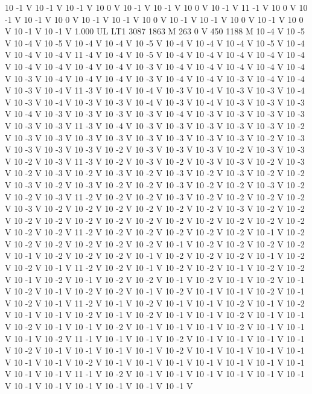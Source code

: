 {{10 -1 V
10 -1 V
10 -1 V
10 0 V
10 -1 V
10 -1 V
10 0 V
10 -1 V
11 -1 V
10 0 V
10 -1 V
10 -1 V
10 0 V
10 -1 V
10 -1 V
10 0 V
10 -1 V
10 -1 V
10 0 V
10 -1 V
10 0 V
10 -1 V
10 -1 V
1.000 UL
LT1
3087 1863 M
263 0 V
450 1188 M
10 -4 V
10 -5 V
10 -4 V
10 -5 V
10 -4 V
10 -4 V
10 -5 V
10 -4 V
10 -4 V
10 -4 V
10 -5 V
10 -4 V
10 -4 V
10 -4 V
11 -4 V
10 -4 V
10 -5 V
10 -4 V
10 -4 V
10 -4 V
10 -4 V
10 -4 V
10 -4 V
10 -4 V
10 -4 V
10 -4 V
10 -3 V
10 -4 V
10 -4 V
10 -4 V
10 -4 V
10 -4 V
10 -3 V
10 -4 V
10 -4 V
10 -4 V
10 -3 V
10 -4 V
10 -4 V
10 -3 V
10 -4 V
10 -4 V
10 -3 V
10 -4 V
11 -3 V
10 -4 V
10 -4 V
10 -3 V
10 -4 V
10 -3 V
10 -3 V
10 -4 V
10 -3 V
10 -4 V
10 -3 V
10 -3 V
10 -4 V
10 -3 V
10 -4 V
10 -3 V
10 -3 V
10 -3 V
10 -4 V
10 -3 V
10 -3 V
10 -3 V
10 -3 V
10 -4 V
10 -3 V
10 -3 V
10 -3 V
10 -3 V
10 -3 V
10 -3 V
11 -3 V
10 -4 V
10 -3 V
10 -3 V
10 -3 V
10 -3 V
10 -3 V
10 -2 V
10 -3 V
10 -3 V
10 -3 V
10 -3 V
10 -3 V
10 -3 V
10 -3 V
10 -3 V
10 -2 V
10 -3 V
10 -3 V
10 -3 V
10 -3 V
10 -2 V
10 -3 V
10 -3 V
10 -3 V
10 -2 V
10 -3 V
10 -3 V
10 -2 V
10 -3 V
11 -3 V
10 -2 V
10 -3 V
10 -2 V
10 -3 V
10 -3 V
10 -2 V
10 -3 V
10 -2 V
10 -3 V
10 -2 V
10 -3 V
10 -2 V
10 -3 V
10 -2 V
10 -3 V
10 -2 V
10 -2 V
10 -3 V
10 -2 V
10 -3 V
10 -2 V
10 -2 V
10 -3 V
10 -2 V
10 -2 V
10 -3 V
10 -2 V
10 -2 V
10 -3 V
11 -2 V
10 -2 V
10 -2 V
10 -3 V
10 -2 V
10 -2 V
10 -2 V
10 -2 V
10 -3 V
10 -2 V
10 -2 V
10 -2 V
10 -2 V
10 -2 V
10 -2 V
10 -3 V
10 -2 V
10 -2 V
10 -2 V
10 -2 V
10 -2 V
10 -2 V
10 -2 V
10 -2 V
10 -2 V
10 -2 V
10 -2 V
10 -2 V
10 -2 V
10 -2 V
11 -2 V
10 -2 V
10 -2 V
10 -2 V
10 -2 V
10 -2 V
10 -1 V
10 -2 V
10 -2 V
10 -2 V
10 -2 V
10 -2 V
10 -2 V
10 -1 V
10 -2 V
10 -2 V
10 -2 V
10 -2 V
10 -1 V
10 -2 V
10 -2 V
10 -2 V
10 -1 V
10 -2 V
10 -2 V
10 -2 V
10 -1 V
10 -2 V
10 -2 V
10 -1 V
11 -2 V
10 -2 V
10 -1 V
10 -2 V
10 -2 V
10 -1 V
10 -2 V
10 -2 V
10 -1 V
10 -2 V
10 -1 V
10 -2 V
10 -2 V
10 -1 V
10 -2 V
10 -1 V
10 -2 V
10 -1 V
10 -2 V
10 -1 V
10 -2 V
10 -2 V
10 -1 V
10 -2 V
10 -1 V
10 -1 V
10 -2 V
10 -1 V
10 -2 V
10 -1 V
11 -2 V
10 -1 V
10 -2 V
10 -1 V
10 -1 V
10 -2 V
10 -1 V
10 -2 V
10 -1 V
10 -1 V
10 -2 V
10 -1 V
10 -2 V
10 -1 V
10 -1 V
10 -2 V
10 -1 V
10 -1 V
10 -2 V
10 -1 V
10 -1 V
10 -2 V
10 -1 V
10 -1 V
10 -1 V
10 -2 V
10 -1 V
10 -1 V
10 -1 V
10 -2 V
11 -1 V
10 -1 V
10 -1 V
10 -2 V
10 -1 V
10 -1 V
10 -1 V
10 -1 V
10 -2 V
10 -1 V
10 -1 V
10 -1 V
10 -1 V
10 -2 V
10 -1 V
10 -1 V
10 -1 V
10 -1 V
10 -1 V
10 -1 V
10 -2 V
10 -1 V
10 -1 V
10 -1 V
10 -1 V
10 -1 V
10 -1 V
10 -1 V
10 -1 V
10 -1 V
11 -1 V
10 -2 V
10 -1 V
10 -1 V
10 -1 V
10 -1 V
10 -1 V
10 -1 V
10 -1 V
10 -1 V
10 -1 V
10 -1 V
10 -1 V
10 -1 V
}}
